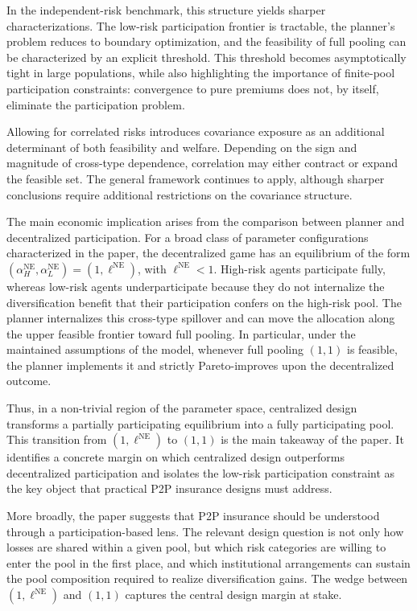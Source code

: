 \documentclass[a4paper,12pt]{article}
\theoremstyle{definition}
\theoremstyle{remark}
\newcommand{\1}{\mathbf{1}}
\begin{document}
In the independent-risk benchmark, this structure yields sharper
characterizations. The low-risk participation frontier is tractable,
the planner's problem reduces to boundary optimization, and the
feasibility of full pooling can be characterized by an explicit
threshold. This threshold becomes asymptotically tight in large
populations, while also highlighting the importance of finite-pool
participation constraints: convergence to pure premiums does not, by
itself, eliminate the participation problem.

Allowing for correlated risks introduces covariance exposure as an
additional determinant of both feasibility and welfare. Depending on
the sign and magnitude of cross-type dependence, correlation may
either contract or expand the feasible set. The general framework
continues to apply, although sharper conclusions require additional
restrictions on the covariance structure.

The main economic implication arises from the comparison between
planner and decentralized participation. For a broad class of
parameter configurations characterized in the paper, the decentralized
game has an equilibrium of the form
\((\alpha_H^{\mathrm{NE}},\alpha_L^{\mathrm{NE}})
=(1,\ell^{\mathrm{NE}})\), with \(\ell^{\mathrm{NE}}<1\). High-risk
agents participate fully, whereas low-risk agents underparticipate
because they do not internalize the diversification benefit that their
participation confers on the high-risk pool. The planner internalizes
this cross-type spillover and can move the allocation along the upper
feasible frontier toward full pooling. In particular, under the
maintained assumptions of the model, whenever full pooling
\((1,1)\) is feasible, the planner implements it and strictly
Pareto-improves upon the decentralized outcome.

Thus, in a non-trivial region of the parameter space, centralized
design transforms a partially participating equilibrium into a fully
participating pool. This transition from
\((1,\ell^{\mathrm{NE}})\) to \((1,1)\) is the main takeaway of the
paper. It identifies a concrete margin on which centralized design
outperforms decentralized participation and isolates the low-risk
participation constraint as the key object that practical P2P
insurance designs must address.

More broadly, the paper suggests that P2P insurance should be
understood through a participation-based lens. The relevant design
question is not only how losses are shared within a given pool, but
which risk categories are willing to enter the pool in the first
place, and which institutional arrangements can sustain the pool
composition required to realize diversification gains. The wedge
between \((1,\ell^{\mathrm{NE}})\) and \((1,1)\) captures the central
design margin at stake.
\end{document}
